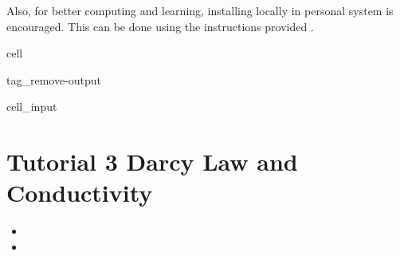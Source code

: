 \documentclass[letterpaper,10pt,english]{jupyterBook}
\begin{document}
\sphinxAtStartPar
Also, for better computing and learning, installing  locally in personal system is encouraged. This can be done using the instructions provided .

\sphinxstepscope

\begin{sphinxuseclass}{cell}
\begin{sphinxuseclass}{tag_remove-output}\begin{sphinxVerbatimInput}

\begin{sphinxuseclass}{cell_input}
\begin{sphinxVerbatim}[commandchars=\\\{\}]
   
   
    
   
\end{sphinxVerbatim}

\end{sphinxuseclass}\end{sphinxVerbatimInput}

\end{sphinxuseclass}
\end{sphinxuseclass}

\chapter{Tutorial 3 \sphinxhyphen{} Darcy Law and Conductivity}
\label{\detokenize{content/tutorials/T3/tutorial_03:tutorial-3-darcy-law-and-conductivity}}\label{\detokenize{content/tutorials/T3/tutorial_03::doc}}
\sphinxAtStartPar
{}
\begin{itemize}
\item {} 
\sphinxAtStartPar
{}

\item {} 
\sphinxAtStartPar
{}

\end{itemize}
\end{document}
